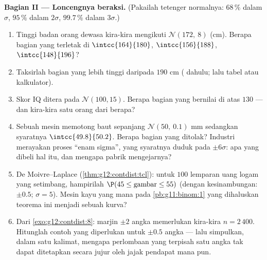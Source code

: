 \begin{problem}
\medskip
\noindent\textbf{Bagian II --- Loncengnya beraksi.}
(Pakailah tetenger normalnya: $68\,\%$ dalam $\sigma$, $95\,\%$
dalam $2\sigma$, $99.7\,\%$ dalam $3\sigma$.)
\begin{enumerate}[resume]
  \item Tinggi badan orang dewasa kira-kira mengikuti
        $\mathcal N(172,\ 8)$ (cm). Berapa bagian yang terletak di
        $\intcc{164}{180}$, $\intcc{156}{188}$,
        $\intcc{148}{196}$?
  \item Taksirlah bagian yang lebih tinggi daripada $190$ cm (
        dahulu; lalu tabel atau kalkulator).
  \item Skor IQ ditera pada $\mathcal N(100, 15)$.
        Berapa bagian yang bernilai di atas $130$ --- dan kira-kira satu
        orang dari berapa?
  \item Sebuah mesin memotong baut sepanjang
        $\mathcal N(50,\ 0.1)$ mm sedangkan syaratnya
        $\intcc{49.8}{50.2}$. Berapa bagian yang ditolak? Industri
        merayakan proses ``enam sigma'', yang
        syaratnya duduk pada $\pm 6\sigma$: apa yang dibeli hal itu,
        dan mengapa pabrik mengejarnya?
  \item De Moivre--Laplace (\cref{thm:g12:contdist:tcl}): untuk
        $100$ lemparan uang logam yang setimbang, hampirilah
        $\P(45 \leq \text{gambar} \leq 55)$ (dengan kesinambungan:
        $\pm 0.5$; $\sigma = 5$). Mesin kayu yang mana pada
        \cref{pb:g11:binom:1} yang dihaluskan teorema ini menjadi
        sebuah kurva?
  \item Dari \cref{exo:g12:contdist:8}: marjin $\pm 2$ angka
        memerlukan kira-kira $n = 2\,400$. Hitunglah contoh yang diperlukan untuk
        $\pm 0.5$ angka --- lalu simpulkan, dalam satu kalimat, mengapa
        perlombaan yang terpisah satu angka tak dapat ditetapkan secara jujur
        oleh jajak pendapat mana pun.
\end{enumerate}


\end{problem}
